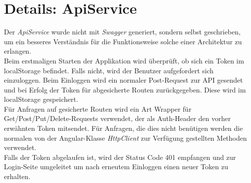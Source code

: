 \documentclass[12pt, letterpaper]{article}
\begin{document}
\newpage

\section{Details: ApiService}
\label{components}

Der \textit{ApiService} wurde nicht mit \textit{Swagger} generiert, sondern selbst geschrieben, um ein besseres Verständnis für die Funktionsweise solche einer Architektur zu erlangen.\\

Beim erstmaligen Starten der Applikation wird überprüft, ob sich ein Token im localStorage befindet. Falls nicht, wird der Benutzer aufgefordert sich einzuloggen. Beim Einloggen wird ein normaler Post-Request zur API gesendet und bei Erfolg der Token für abgesicherte Routen zurückgegeben. Diese wird im localStorage gespeichert.\\

Für Anfragen auf gesicherte Routen wird ein Art Wrapper für Get/Post/Put/Delete-Requests verwendet, der als Auth-Header den vorher erwähnten Token mitsendet. Für Anfragen, die dies nicht benütigen werden die normalen von der Angular-Klasse \textit{HttpClient} zur Verfügung gestellten Methoden verwendet.\\

Falls der Token abgelaufen ist, wird der Status Code 401 empfangen und zur Login-Seite umgeleitet um nach erneutem Einloggen einen neuer Token zu erhalten.\\
\end{document}
